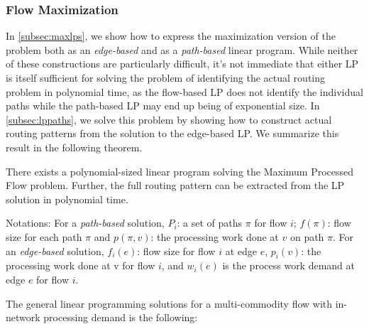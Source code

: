 \subsubsection{Flow Maximization}

In \autoref{subsec:maxlps}, we show how to express the maximization version of the problem both as an \textit{edge-based} and as a \textit{path-based} linear program. While neither of these constructions are particularly difficult, it's not immediate that either LP is itself sufficient for solving the problem of identifying the actual routing problem in polynomial time, as the flow-based LP does not identify the individual paths while the path-based LP may end up being of exponential size. In \autoref{subsec:lppaths}, we solve this problem by showing how to construct actual routing patterns from the solution to the edge-based LP. We summarize this result in the following theorem.

\begin{theorem}
\label{thm:flowmax}
There exists a polynomial-sized linear program solving the Maximum Processed Flow problem. Further, the full routing pattern can be extracted from the LP solution in polynomial time.  
\end{theorem}

Notations:
\newline
For a \emph{path-based} solution, $P_i$: a set of paths $\pi$ for flow $i$; $f(\pi)$: flow size for each path $\pi$ and $p(\pi,v)$: the processing work done at $v$ on path $\pi$.
\newline For an \emph{edge-based} solution, $f_i(e)$: flow size for flow $i$ at edge $e$, $p_i(v)$: the processing work done at v for flow $i$, and $w_i(e)$ is the process work demand at edge $e$ for flow $i$. 

The general linear programming solutions for a multi-commodity flow with in-network processing demand is the following:

